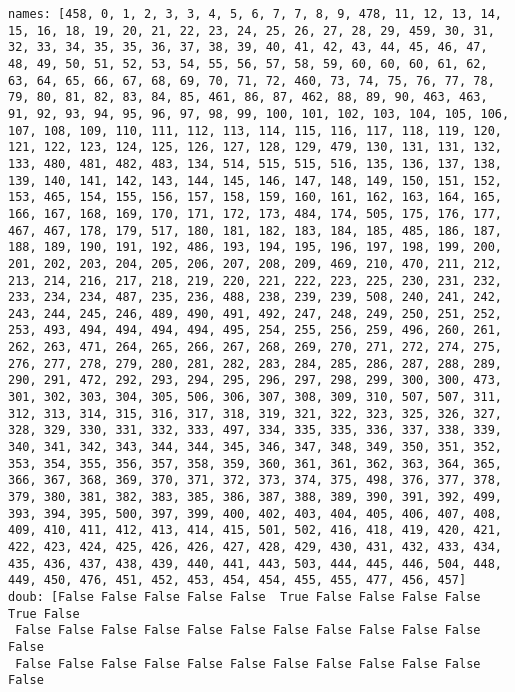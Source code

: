 \documentclass[11pt]{article}
\begin{document}
\begin{Verbatim}[commandchars=\\\{\}]
names: [458, 0, 1, 2, 3, 3, 4, 5, 6, 7, 7, 8, 9, 478, 11, 12, 13, 14, 15, 16, 18, 19, 20, 21, 22, 23, 24, 25, 26, 27, 28, 29, 459, 30, 31, 32, 33, 34, 35, 35, 36, 37, 38, 39, 40, 41, 42, 43, 44, 45, 46, 47, 48, 49, 50, 51, 52, 53, 54, 55, 56, 57, 58, 59, 60, 60, 60, 61, 62, 63, 64, 65, 66, 67, 68, 69, 70, 71, 72, 460, 73, 74, 75, 76, 77, 78, 79, 80, 81, 82, 83, 84, 85, 461, 86, 87, 462, 88, 89, 90, 463, 463, 91, 92, 93, 94, 95, 96, 97, 98, 99, 100, 101, 102, 103, 104, 105, 106, 107, 108, 109, 110, 111, 112, 113, 114, 115, 116, 117, 118, 119, 120, 121, 122, 123, 124, 125, 126, 127, 128, 129, 479, 130, 131, 131, 132, 133, 480, 481, 482, 483, 134, 514, 515, 515, 516, 135, 136, 137, 138, 139, 140, 141, 142, 143, 144, 145, 146, 147, 148, 149, 150, 151, 152, 153, 465, 154, 155, 156, 157, 158, 159, 160, 161, 162, 163, 164, 165, 166, 167, 168, 169, 170, 171, 172, 173, 484, 174, 505, 175, 176, 177, 467, 467, 178, 179, 517, 180, 181, 182, 183, 184, 185, 485, 186, 187, 188, 189, 190, 191, 192, 486, 193, 194, 195, 196, 197, 198, 199, 200, 201, 202, 203, 204, 205, 206, 207, 208, 209, 469, 210, 470, 211, 212, 213, 214, 216, 217, 218, 219, 220, 221, 222, 223, 225, 230, 231, 232, 233, 234, 234, 487, 235, 236, 488, 238, 239, 239, 508, 240, 241, 242, 243, 244, 245, 246, 489, 490, 491, 492, 247, 248, 249, 250, 251, 252, 253, 493, 494, 494, 494, 494, 495, 254, 255, 256, 259, 496, 260, 261, 262, 263, 471, 264, 265, 266, 267, 268, 269, 270, 271, 272, 274, 275, 276, 277, 278, 279, 280, 281, 282, 283, 284, 285, 286, 287, 288, 289, 290, 291, 472, 292, 293, 294, 295, 296, 297, 298, 299, 300, 300, 473, 301, 302, 303, 304, 305, 506, 306, 307, 308, 309, 310, 507, 507, 311, 312, 313, 314, 315, 316, 317, 318, 319, 321, 322, 323, 325, 326, 327, 328, 329, 330, 331, 332, 333, 497, 334, 335, 335, 336, 337, 338, 339, 340, 341, 342, 343, 344, 344, 345, 346, 347, 348, 349, 350, 351, 352, 353, 354, 355, 356, 357, 358, 359, 360, 361, 361, 362, 363, 364, 365, 366, 367, 368, 369, 370, 371, 372, 373, 374, 375, 498, 376, 377, 378, 379, 380, 381, 382, 383, 385, 386, 387, 388, 389, 390, 391, 392, 499, 393, 394, 395, 500, 397, 399, 400, 402, 403, 404, 405, 406, 407, 408, 409, 410, 411, 412, 413, 414, 415, 501, 502, 416, 418, 419, 420, 421, 422, 423, 424, 425, 426, 426, 427, 428, 429, 430, 431, 432, 433, 434, 435, 436, 437, 438, 439, 440, 441, 443, 503, 444, 445, 446, 504, 448, 449, 450, 476, 451, 452, 453, 454, 454, 455, 455, 477, 456, 457]
doub: [False False False False False  True False False False False  True False
 False False False False False False False False False False False False
 False False False False False False False False False False False False

\end{Verbatim}
\end{document}

